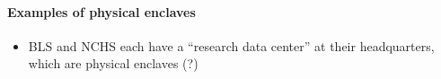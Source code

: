\begin{comment}
Conversely, both types of data enclaves can also decrease the utility of the data. The process for requesting access to restricted use data can be arduous and thus reduce the number of researchers who can access the data. Researchers must submit research proposals containing detailed information about the research project, the hypotheses to be tested, the data set and variables to be used in the analysis,
the empirical methods to be used, and the specific data outputs that will result from the project thus limiting exploratory analyses. Research proposals are reviewed and approved by a review committee which can take several weeks or months to complete. Additionally, users must agree to terms and conditions governing the access and use of the confidential data as well as sign nondisclosure affidavits. Some researchers are required to complete background investigations, Special Sworn Status, be citizens of the U.S.,  …etc.  Furthermore, there are costs associated with accessing restricted use data via data enclaves [include examples]. Costs reduce the utility of the data because some researchers may not have funding to complete research. Most students completing graduate or doctoral level research, living on fixed incomes, may not be able to afford to access data in enclaves. 

Both types of data enclaves allow researchers to improve the accuracy and precision of their estimates. Data available in enclaves are not subject to the statistical disclosure limitation methods that public use files are subject to prior to release. For example, detailed race/ethnicity and geography measures are typically not available on public use files due to disclosure concerns. These types of measures are available to researchers in data enclaves thus increasing the accuracy and prevision of estimates.  [Might include examples of research completed in RDCs that could not be completed using PUFs].

Data quality can also be decreased when accessing restricted use data in data enclaves. Extreme values or values representing an individual are generally removed from analysis (e.g. minima, maxima, medians). These values might be useful to researchers doing sensitivity analysis. {need to expand this section}
\end{comment}

\paragraph{Examples of physical enclaves}
\begin{itemize}
    \item BLS and NCHS each have a ``research data center'' at their headquarters, which are physical enclaves (?)
\end{itemize}


